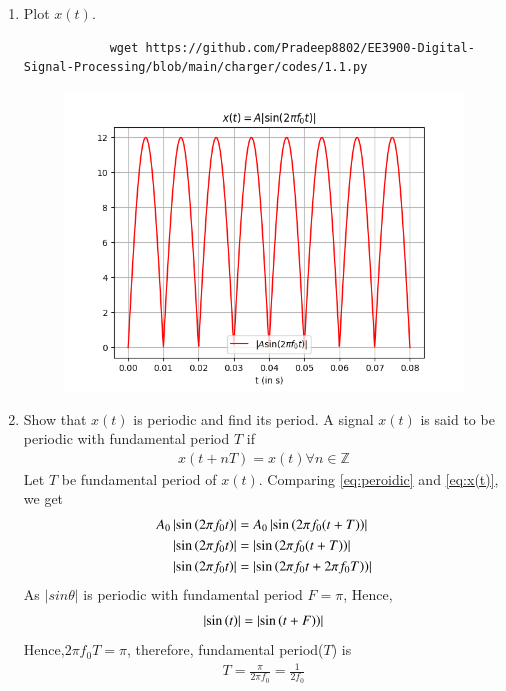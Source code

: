 \documentclass[journal,12pt,twocolumn]{IEEEtran}
\renewcommand\thesection{\arabic{section}}
\begin{document}
	\begin{enumerate}[label=\thesection.\arabic*
		,ref=\thesection.\theenumi]
		\item Plot $x(t)$.\\
		\solution 
		\begin{lstlisting}
			wget https://github.com/Pradeep8802/EE3900-Digital-Signal-Processing/blob/main/charger/codes/1.1.py
		\end{lstlisting}
		\begin{figure}[!ht]
			\centering
			\includegraphics[width=\columnwidth]{./figs/1_1.png}
			\caption{}
		\end{figure}
		\item Show that $x(t)$ is periodic and find its period.
		\solution 
		A signal $x(t)$ is said to be periodic with fundamental period $T$ if
		\begin{align}
			\label{eq:peroidic}
			x(t+nT)=x(t) \forall n \in \mathbb{Z}
		\end{align}
		Let $T$ be fundamental period of $x(t)$. Comparing \eqref{eq:peroidic} and \eqref{eq:x(t)}, we get
		\begin{align}
			A_0\left\vert\sin\left(2\pi f_0 t\right)\right\vert&=A_0\left\vert\sin\left(2\pi f_0 (t+T)\right)\right\vert\\
			\left\vert\sin\left(2\pi f_0 t\right)\right\vert&=\left\vert\sin\left(2\pi f_0 (t+T)\right)\right\vert\\
			\left\vert\sin\left(2\pi f_0 t\right)\right\vert&=\left\vert\sin\left(2\pi f_0 t+2\pi f_0 T)\right)\right\vert
		\end{align}
		As $|sin\theta|$ is periodic with fundamental period $F=\pi$, Hence,
		\begin{align}
			\left\vert\sin\left(t\right)\right\vert=\left\vert\sin\left(t+F)\right)\right\vert
		\end{align}
		Hence,$2\pi f_0  T=\pi$, therefore, fundamental period($T$) is 
		\begin{align}
			\label{eq:ftp}
			T=\frac{\pi}{2 \pi f_0}=\frac{1}{2f_0}
		\end{align}
	\end{enumerate}
\end{document}
